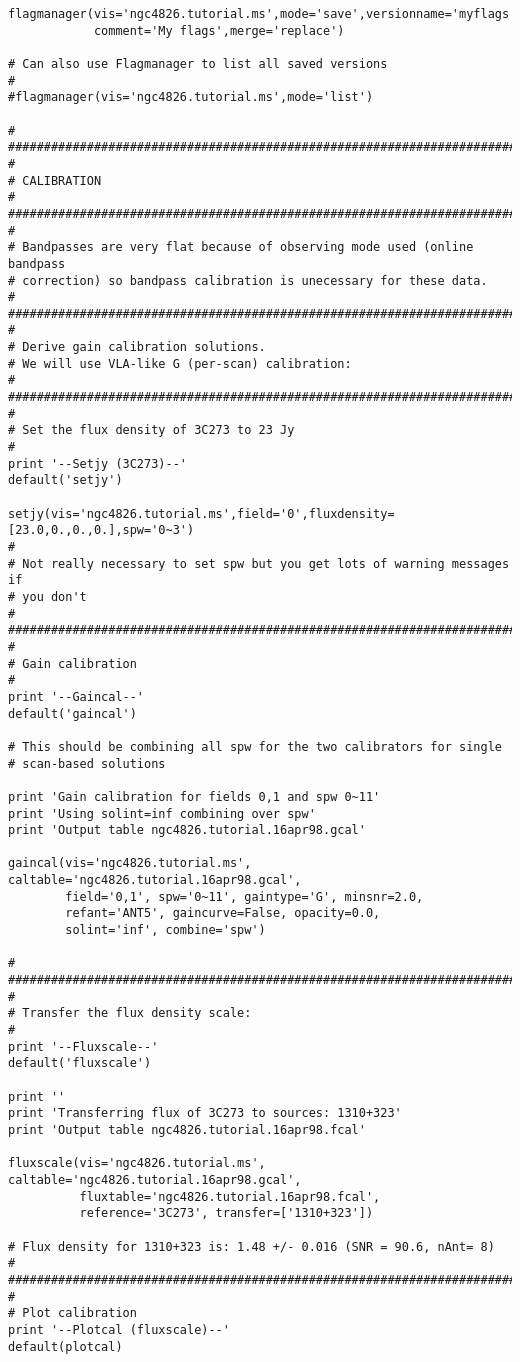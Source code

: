 \begin{verbatim}
flagmanager(vis='ngc4826.tutorial.ms',mode='save',versionname='myflags',
            comment='My flags',merge='replace')

# Can also use Flagmanager to list all saved versions
#
#flagmanager(vis='ngc4826.tutorial.ms',mode='list')

#
##########################################################################
#
# CALIBRATION
#
##########################################################################
#
# Bandpasses are very flat because of observing mode used (online bandpass
# correction) so bandpass calibration is unecessary for these data.
#
##########################################################################
#
# Derive gain calibration solutions.
# We will use VLA-like G (per-scan) calibration:
#
##########################################################################
#
# Set the flux density of 3C273 to 23 Jy
#
print '--Setjy (3C273)--'
default('setjy')

setjy(vis='ngc4826.tutorial.ms',field='0',fluxdensity=[23.0,0.,0.,0.],spw='0~3')
#
# Not really necessary to set spw but you get lots of warning messages if
# you don't
#
##########################################################################
#
# Gain calibration
#
print '--Gaincal--'
default('gaincal')

# This should be combining all spw for the two calibrators for single
# scan-based solutions

print 'Gain calibration for fields 0,1 and spw 0~11'
print 'Using solint=inf combining over spw'
print 'Output table ngc4826.tutorial.16apr98.gcal'

gaincal(vis='ngc4826.tutorial.ms', caltable='ngc4826.tutorial.16apr98.gcal',
        field='0,1', spw='0~11', gaintype='G', minsnr=2.0,
        refant='ANT5', gaincurve=False, opacity=0.0,
        solint='inf', combine='spw')

#
##########################################################################
#
# Transfer the flux density scale:
#
print '--Fluxscale--'
default('fluxscale')

print ''
print 'Transferring flux of 3C273 to sources: 1310+323'
print 'Output table ngc4826.tutorial.16apr98.fcal'

fluxscale(vis='ngc4826.tutorial.ms', caltable='ngc4826.tutorial.16apr98.gcal',
          fluxtable='ngc4826.tutorial.16apr98.fcal',
          reference='3C273', transfer=['1310+323'])

# Flux density for 1310+323 is: 1.48 +/- 0.016 (SNR = 90.6, nAnt= 8)
#
##########################################################################
#
# Plot calibration
print '--Plotcal (fluxscale)--'
default(plotcal)


\end{verbatim}
